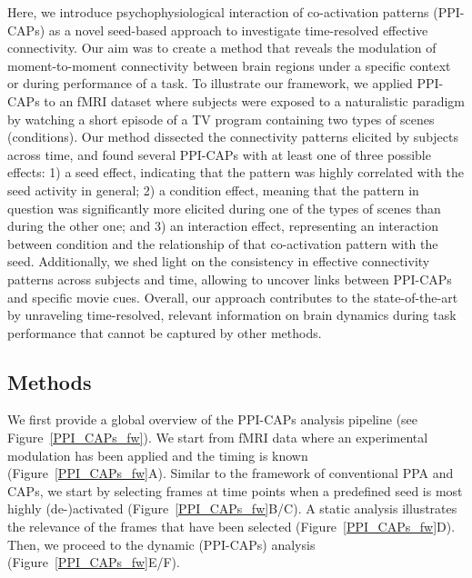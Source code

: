Here, we introduce psychophysiological interaction of co-activation patterns (PPI-CAPs) as a novel seed-based approach to investigate time-resolved effective connectivity. Our aim was to create a method that reveals the modulation of moment-to-moment connectivity between brain regions under a specific context or during performance of a task. To illustrate our framework, we applied PPI-CAPs to an fMRI dataset where subjects were exposed to a naturalistic paradigm by watching a short episode of a TV program containing two types of scenes (conditions). Our method dissected the connectivity patterns elicited by subjects across time, and found several PPI-CAPs with at least one of three possible effects: 1) a seed effect, indicating that the pattern was highly correlated with the seed activity in general; 2) a condition effect, meaning that the pattern in question was significantly more elicited during one of the types of scenes than during the other one; and 3) an interaction effect, representing an interaction between condition and the relationship of that co-activation pattern with the seed. Additionally, we shed light on the consistency in effective connectivity patterns across subjects and time, allowing to uncover links between PPI-CAPs and specific movie cues. Overall, our approach contributes to the state-of-the-art by unraveling time-resolved, relevant information on brain dynamics during task performance that cannot be captured by other methods. 



\subsection{Methods}
\label{sec:methods-ppi-caps}
We first provide a global overview of the PPI-CAPs analysis pipeline (see Figure~\ref{PPI_CAPs_fw}). We start from fMRI data where an experimental modulation has been applied and the timing is known (Figure~\ref{PPI_CAPs_fw}A). Similar to the framework of conventional PPA and CAPs, we start by selecting frames at time points when a predefined seed is most highly (de-)activated (Figure~\ref{PPI_CAPs_fw}B/C). A static analysis illustrates the relevance of the frames that have been selected (Figure~\ref{PPI_CAPs_fw}D). Then, we proceed to the dynamic (PPI-CAPs) analysis (Figure~\ref{PPI_CAPs_fw}E/F). 


